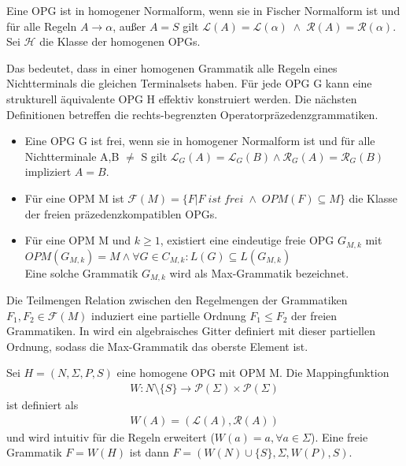 \begin{definition}
Eine OPG ist in homogener Normalform, wenn sie in Fischer Normalform ist und für alle Regeln $A\rightarrow \alpha$, außer $A=S$ gilt $\mathcal{L}(A) = \mathcal{L}(\alpha) \; \wedge \; \mathcal{R}(A) = \mathcal{R}(\alpha)$.
Sei $\mathcal{H}$ die Klasse der homogenen OPGs.
\end{definition}
Das bedeutet, dass in einer homogenen Grammatik alle Regeln eines Nichtterminals die gleichen Terminalsets haben. Für jede OPG G kann eine strukturell äquivalente OPG H effektiv konstruiert werden. Die nächsten Definitionen betreffen die rechts-begrenzten Operatorpräzedenzgrammatiken.
\begin{definition}
\begin{itemize}
\item
Eine OPG G ist frei, wenn sie in homogener Normalform ist und für alle Nichtterminale A,B $\neq$ S gilt $\mathcal{L}_G(A) = \mathcal{L}_G(B) \wedge \mathcal{R}_G(A)=\mathcal{R}_G(B)$ impliziert $A=B$.
\item
 Für eine OPM M ist $\mathcal{F}(M)=\{F|F \; ist \; frei \; \wedge \; OPM(F) \subseteq M\}$ die Klasse der freien präzedenzkompatiblen OPGs.
 \item
 Für eine OPM M und $k \geq 1$, existiert eine eindeutige freie OPG $G_{M,k}$ mit $OPM(G_{M,k})= M \wedge \forall G \in C_{M,k}: L(G) \subseteq L(G_{M,k})$ \\
 Eine solche Grammatik $G_{M,k}$ wird als Max-Grammatik bezeichnet.
\end{itemize}
\end{definition}
Die Teilmengen Relation zwischen den Regelmengen der Grammatiken $F_1, F_2 \in \mathcal{F}(M)$ induziert eine partielle Ordnung $F_1 \leq F_2$ der freien Grammatiken. In \cite{algebraic_properties} wird ein algebraisches Gitter definiert mit dieser partiellen Ordnung, sodass die Max-Grammatik das oberste Element ist.

\begin{definition}
Sei $H=(N, \Sigma, P, S)$ eine homogene OPG mit OPM M. Die Mappingfunktion 
\begin{align}
W: N \setminus \{S\} \rightarrow \mathcal{P}(\Sigma) \times \mathcal{P}(\Sigma)
\end{align}
ist definiert als
\begin{align}
W(A)=\left(\mathcal{L}(A), \mathcal{R}(A)\right)
\end{align}
und wird intuitiv für die Regeln erweitert ($W(a)=a, \forall a\in \Sigma$). Eine freie Grammatik $F=W(H)$ ist dann $F=(W(N) \cup \{S\}, \Sigma, W(P), S)$.
\end{definition}

